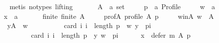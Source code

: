 \begin{isabellebody}
\ \ \ \ \isamarkupfalse%
\ {\isacharparenleft}{\kern0pt}metis\ {\isacharparenleft}{\kern0pt}no{\isacharunderscore}{\kern0pt}types{\isacharcomma}{\kern0pt}\ lifting{\isacharparenright}{\kern0pt}{\isacharparenright}{\kern0pt}\isanewline
{}\isamarkupfalse%
\isanewline
\ \ \isamarkupfalse%
\isanewline
\ \ \ \ A\ {\isacharcolon}{\kern0pt}{\isacharcolon}{\kern0pt}\ {\isachardoublequoteopen}{\isacharprime}{\kern0pt}a\ set{\isachardoublequoteclose}\ \isanewline
\ \ \ \ p\ {\isacharcolon}{\kern0pt}{\isacharcolon}{\kern0pt}\ {\isachardoublequoteopen}{\isacharprime}{\kern0pt}a\ Profile{\isachardoublequoteclose}\ \isanewline
\ \ \ \ w\ {\isacharcolon}{\kern0pt}{\isacharcolon}{\kern0pt}\ {\isachardoublequoteopen}{\isacharprime}{\kern0pt}a{\isachardoublequoteclose}\ \isanewline
\ \ \ \ x\ {\isacharcolon}{\kern0pt}{\isacharcolon}{\kern0pt}\ {\isachardoublequoteopen}{\isacharprime}{\kern0pt}a{\isachardoublequoteclose}\isanewline
\ \ \isamarkupfalse%
\isanewline
\ \ \ \ finite{\isacharcolon}{\kern0pt}\ {\isachardoublequoteopen}finite\ A{\isachardoublequoteclose}\ \isanewline
\ \ \ \ prof{\isacharunderscore}{\kern0pt}A{\isacharcolon}{\kern0pt}\ {\isachardoublequoteopen}profile\ A\ p{\isachardoublequoteclose}\ \isanewline
\ \ \ \ w{\isacharunderscore}{\kern0pt}in{\isacharunderscore}{\kern0pt}A{\isacharcolon}{\kern0pt}\ {\isachardoublequoteopen}w\ {\isasymin}\ A{\isachardoublequoteclose}\ \isanewline
\ \ \ \ {}{\isacharcolon}{\kern0pt}\ {\isachardoublequoteopen}{\isasymforall}y{\isasymin}A\ {\isacharminus}{\kern0pt}\ {\isacharbraceleft}{\kern0pt}w{\isacharbraceright}{\kern0pt}{\isachardot}{\kern0pt}\isanewline
\ \ \ \ \ \ \ \ \ \ card\ {\isacharbraceleft}{\kern0pt}i{\isachardot}{\kern0pt}\ i\ {\isacharless}{\kern0pt}\ length\ p\ {\isasymand}\ {\isacharparenleft}{\kern0pt}w{\isacharcomma}{\kern0pt}\ y{\isacharparenright}{\kern0pt}\ {\isasymin}\ {\isacharparenleft}{\kern0pt}p{\isacharbang}{\kern0pt}i{\isacharparenright}{\kern0pt}{\isacharbraceright}{\kern0pt}\ {\isacharless}{\kern0pt}\isanewline
\ \ \ \ \ \ \ \ \ \ \ \ card\ {\isacharbraceleft}{\kern0pt}i{\isachardot}{\kern0pt}\ i\ {\isacharless}{\kern0pt}\ length\ p\ {\isasymand}\ {\isacharparenleft}{\kern0pt}y{\isacharcomma}{\kern0pt}\ w{\isacharparenright}{\kern0pt}\ {\isasymin}\ {\isacharparenleft}{\kern0pt}p{\isacharbang}{\kern0pt}i{\isacharparenright}{\kern0pt}{\isacharbraceright}{\kern0pt}{\isachardoublequoteclose}\ \isanewline
\ \ \ \ {}{\isacharcolon}{\kern0pt}\ {\isachardoublequoteopen}x\ {\isasymin}\ defer\ m\ A\ p{\isachardoublequoteclose}\isanewline

\end{isabellebody}
